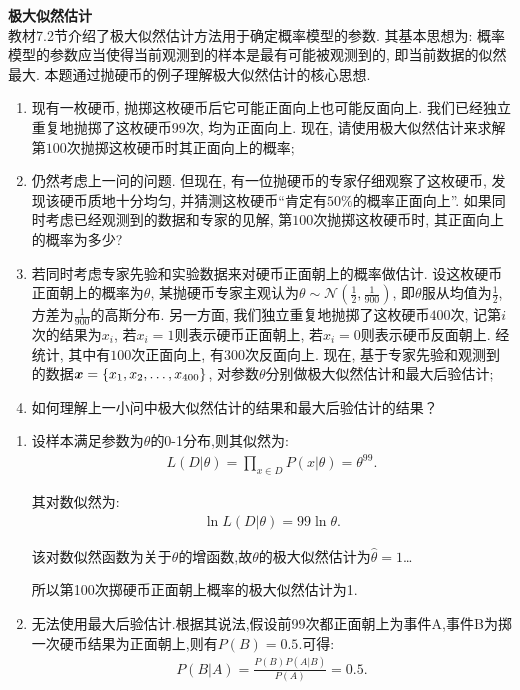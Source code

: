 \documentclass[answers]{exam}  %
\begin{document}
\begin{questions}
	\question [20] \textbf{极大似然估计} \\
	教材7.2节介绍了极大似然估计方法用于确定概率模型的参数. 其基本思想为: 概率模型的参数应当使得当前观测到的样本是最有可能被观测到的, 即当前数据的似然最大. 本题通过抛硬币的例子理解极大似然估计的核心思想.
	\begin{enumerate}
		\item 现有一枚硬币, 抛掷这枚硬币后它可能正面向上也可能反面向上. 我们已经独立重复地抛掷了这枚硬币$99$次, 均为正面向上. 现在, 请使用极大似然估计来求解第$100$次抛掷这枚硬币时其正面向上的概率;
		\item 仍然考虑上一问的问题. 但现在, 有一位抛硬币的专家仔细观察了这枚硬币, 发现该硬币质地十分均匀, 并猜测这枚硬币“肯定有$50\%$的概率正面向上”. 如果同时考虑已经观测到的数据和专家的见解, 第$100$次抛掷这枚硬币时, 其正面向上的概率为多少?

		\item 若同时考虑专家先验和实验数据来对硬币正面朝上的概率做估计. 设这枚硬币正面朝上的概率为$\theta$, 某抛硬币专家主观认为$\theta\sim\mathcal{N}(\frac{1}{2}, \frac{1}{900})$, 即$\theta$服从均值为$\frac{1}{2}$, 方差为$\frac{1}{900}$的高斯分布. 另一方面, 我们独立重复地抛掷了这枚硬币$400$次, 记第$i$次的结果为$x_i$, 若$x_i=1$则表示硬币正面朝上, 若$x_i=0$则表示硬币反面朝上. 经统计, 其中有$100$次正面向上, 有$300$次反面向上. 现在, 基于专家先验和观测到的数据${\boldsymbol{x}}=\{x_1, x_2, \ldots, x_{400}\}$, 对参数$\theta$分别做极大似然估计和最大后验估计;

		\item 如何理解上一小问中极大似然估计的结果和最大后验估计的结果？
	\end{enumerate}

	\begin{solution}
		\begin{enumerate}
			\item 设样本满足参数为$\theta$的0-1分布,则其似然为:
			      \begin{align*}
				      L(D|\theta)=\prod_{x\in D}P(x|\theta)=\theta^{99}.
			      \end{align*}

			      其对数似然为:
			      \begin{align*}
				      \ln L(D|\theta)=99\ln \theta.
			      \end{align*}

			      该对数似然函数为关于$\theta$的增函数,故$\theta$的极大似然估计为$\hat{\theta}=1$\dots

			      所以第100次掷硬币正面朝上概率的极大似然估计为1.
			\item 无法使用最大后验估计.根据其说法,假设前99次都正面朝上为事件A,事件B为掷一次硬币结果为正面朝上,则有$P(B)=0.5$.可得:
			      \begin{align*}
				      P(B|A)=\frac{P(B)P(A|B)}{P(A)}=0.5.
			      \end{align*}


\end{enumerate}
\end{solution}
\end{questions}
\end{document}
